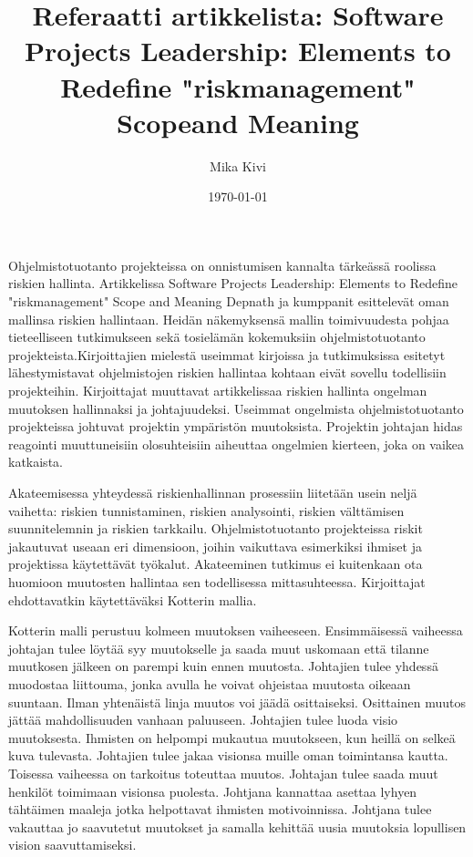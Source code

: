 \documentclass[finnish]{tktltiki2}
\title{Referaatti artikkelista: Software Projects Leadership: Elements to Redefine "riskmanagement" Scopeand Meaning}
\author{Mika Kivi}
\date{\today}
\theoremstyle{definition}
\theoremstyle{remark}
\begin{document}

\maketitle        %






Ohjelmistotuotanto projekteissa on onnistumisen kannalta tärkeässä roolissa riskien hallinta. Artikkelissa Software Projects Leadership: Elements to Redefine "riskmanagement" Scope and Meaning Depnath ja kumppanit esittelevät oman mallinsa riskien hallintaan. Heidän näkemyksensä mallin toimivuudesta pohjaa tieteelliseen tutkimukseen sekä tosielämän kokemuksiin ohjelmistotuotanto projekteista.Kirjoittajien mielestä useimmat kirjoissa ja tutkimuksissa esitetyt lähestymistavat ohjelmistojen riskien hallintaa kohtaan eivät sovellu todellisiin projekteihin. Kirjoittajat muuttavat artikkelissaa riskien hallinta ongelman muutoksen hallinnaksi ja johtajuudeksi. Useimmat ongelmista ohjelmistotuotanto projekteissa johtuvat projektin ympäristön muutoksista.  Projektin johtajan hidas reagointi muuttuneisiin olosuhteisiin aiheuttaa ongelmien kierteen, joka on vaikea katkaista.

Akateemisessa yhteydessä riskienhallinnan prosessiin liitetään usein neljä vaihetta: riskien tunnistaminen, riskien analysointi, riskien välttämisen suunnitelemnin ja riskien tarkkailu. Ohjelmistotuotanto projekteissa riskit jakautuvat useaan eri dimensioon, joihin vaikuttava esimerkiksi ihmiset ja projektissa käytettävät työkalut. Akateeminen tutkimus ei kuitenkaan ota huomioon muutosten hallintaa sen todellisessa mittasuhteessa. Kirjoittajat ehdottavatkin käytettäväksi Kotterin mallia. 

Kotterin malli perustuu kolmeen muutoksen vaiheeseen. Ensimmäisessä vaiheessa johtajan tulee löytää syy muutokselle ja saada muut uskomaan että tilanne muutkosen jälkeen on parempi kuin ennen muutosta. Johtajien tulee yhdessä muodostaa liittouma, jonka avulla he voivat ohjeistaa muutosta oikeaan suuntaan. Ilman yhtenäistä linja muutos voi jäädä osittaiseksi. Osittainen muutos jättää mahdollisuuden vanhaan paluuseen. Johtajien tulee luoda visio muutoksesta. Ihmisten on helpompi mukautua muutokseen, kun heillä on selkeä kuva tulevasta. Johtajien tulee jakaa visionsa muille oman toimintansa kautta. Toisessa vaiheessa on tarkoitus toteuttaa muutos. Johtajan tulee saada muut henkilöt toimimaan visionsa puolesta. Johtjana kannattaa asettaa lyhyen tähtäimen maaleja jotka helpottavat  ihmisten motivoinnissa. Johtjana tulee vakauttaa jo saavutetut muutokset ja samalla kehittää uusia muutoksia lopullisen vision saavuttamiseksi.  
\end{document}
